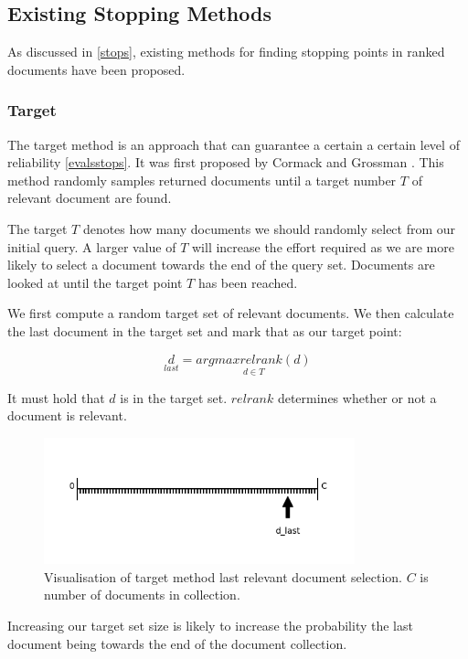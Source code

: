 \subsection{Existing Stopping Methods} \label{methods}

As discussed in \ref{stops}, existing methods for finding stopping points in ranked documents have been proposed.

\subsubsection{Target} \label{target}

The target method is an approach that can guarantee a certain a certain level of reliability \ref{evalsstops}. It was first proposed by Cormack and Grossman \cite{Cormack2016}. This method randomly samples returned documents until a target number $T$ of relevant document are found.

The target $T$ denotes how many documents we should randomly select from our initial query. A larger value of $T$ will increase the effort required as we are more likely to select a document towards the end of the query set. Documents are looked at until the target point $T$ has been reached.

We first compute a random target set of relevant documents. We then calculate the last document in the target set and mark that as our target point:

\begin{equation}
	  \underset{last}{d} = \underset{d \in{T}}{argmax relrank(d)}
\end{equation}

It must hold that $d$ is in the target set. $relrank$ determines whether or not a document is relevant.

\begin{figure}[H]
\center
\includegraphics[width=9cm]{figures/target_method.png}
\caption{Visualisation of target method last relevant document selection. $C$ is number of documents in collection.}
\end{figure}

Increasing our target set size is likely to increase the probability the last document being towards the end of the document collection.

